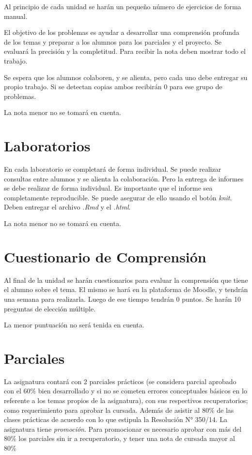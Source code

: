 \documentclass[]{book}
\theoremstyle{definition}
\theoremstyle{definition}
\theoremstyle{definition}
\theoremstyle{remark}
\begin{document}
Al principio de cada unidad se harán un pequeño número de ejercicios de
forma manual.

El objetivo de los problemas es ayudar a desarrollar una comprensión
profunda de los temas y preparar a los alumnos para los parciales y el
proyecto. Se evaluará la precisión y la completitud. Para recibir la
nota deben mostrar todo el trabajo.

Se espera que los alumnos colaboren, y se alienta, pero cada uno debe
entregar su propio trabajo. Si se detectan copias ambos recibirán 0 para
ese grupo de problemas.

La nota menor no se tomará en cuenta.

\hypertarget{laboratorios}{%
\section{Laboratorios}\label{laboratorios}}

En cada laboratorio se completará de forma individual. Se puede realizar
consultas entre alumnos y se alienta la colaboración. Pero la entrega de
informes se debe realizar de forma individual. Es importante que el
informe sea completamente reproducible. Se puede asegurar de ello usando
el botón \emph{knit}. Deben entregar el archivo \emph{.Rmd} y el
\emph{.html}.

La nota menor no se tomará en cuenta.

\hypertarget{cuestionario-de-comprension}{%
\section{Cuestionario de
Comprensión}\label{cuestionario-de-comprension}}

Al final de la unidad se harán cuestionarios para evaluar la comprensión
que tiene el alumno sobre el tema. El mismo se hará en la plataforma de
Moodle, y tendrán una semana para realizarla. Luego de ese tiempo
tendrán 0 puntos. Se harán 10 preguntas de elección múltiple.

La menor puntuación no será tenida en cuenta.

\hypertarget{parciales}{%
\section{Parciales}\label{parciales}}

La asignatura contará con 2 parciales prácticos (se considera parcial
aprobado con el 60\% bien desarrollado y si no se cometen errores
conceptuales básicos en lo referente a los temas propios de la
asignatura), con sus respectivos recuperatorios; como requerimiento para
aprobar la cursada. Además de asistir al 80\% de las clases prácticas de
acuerdo con lo que estipula la Resolución N° 350/14. La asignatura tiene
\emph{promoción}. Para promocionar es necesario aprobar con más del 80\%
los parciales sin ir a recuperatorio, y tener una nota de cursada mayor
al 80\%
\end{document}
